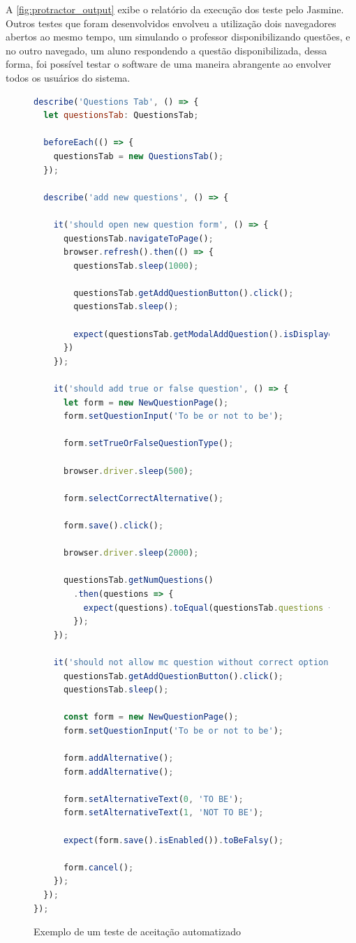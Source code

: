 A \autoref{fig:protractor_output} exibe o relatório da execução dos teste pelo Jasmine. Outros testes
que foram desenvolvidos envolveu a utilização dois navegadores abertos ao mesmo tempo, um simulando
o professor disponibilizando questões, e no outro navegado, um aluno respondendo a questão disponibilizada, dessa forma,
foi possível testar o software de uma maneira abrangente ao envolver todos os usuários do sistema.

\begin{figure}[!ht]
  \caption{Exemplo de um teste de aceitação automatizado}
  \label{fig:testes_automatizados}
  \begin{lstlisting}[language=JavaScript]
describe('Questions Tab', () => {
  let questionsTab: QuestionsTab;

  beforeEach(() => {
    questionsTab = new QuestionsTab();
  });

  describe('add new questions', () => {

    it('should open new question form', () => {
      questionsTab.navigateToPage();
      browser.refresh().then(() => {
        questionsTab.sleep(1000);

        questionsTab.getAddQuestionButton().click();
        questionsTab.sleep();

        expect(questionsTab.getModalAddQuestion().isDisplayed()).toBeTruthy();
      })
    });

    it('should add true or false question', () => {
      let form = new NewQuestionPage();
      form.setQuestionInput('To be or not to be');

      form.setTrueOrFalseQuestionType();

      browser.driver.sleep(500);

      form.selectCorrectAlternative();

      form.save().click();

      browser.driver.sleep(2000);

      questionsTab.getNumQuestions()
        .then(questions => {
          expect(questions).toEqual(questionsTab.questions + 1);
        });
    });

    it('should not allow mc question without correct option', () => {
      questionsTab.getAddQuestionButton().click();
      questionsTab.sleep();

      const form = new NewQuestionPage();
      form.setQuestionInput('To be or not to be');

      form.addAlternative();
      form.addAlternative();

      form.setAlternativeText(0, 'TO BE');
      form.setAlternativeText(1, 'NOT TO BE');

      expect(form.save().isEnabled()).toBeFalsy();

      form.cancel();
    });
  });
});
\end{lstlisting}
\doautor
\end{figure}


